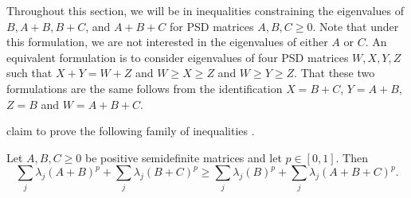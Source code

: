 \documentclass[notitlepage, 10pt]{article}
\begin{document}
Throughout this section, we will be in inequalities constraining the eigenvalues of $B,A+B,B+C$, and $A+B+C$ for PSD matrices $A,B,C \geq 0$.
Note that under this formulation, we are not interested in the eigenvalues of either $A$ or $C$.
An equivalent formulation is to consider eigenvalues of four PSD matrices $W,X,Y,Z$ such that $X+Y=W+Z$ and $W \geq X \geq Z$ and $W \geq Y \geq Z$.
That these two formulations are the same follows from the identification $X = B+C$, $Y = A+B$, $Z = B$ and $W = A+B+C$.


 claim to prove the following family of inequalities \cite[Lemma 5.3]{bouhtou2008optimization}.
\begin{lem}
    \label{lem:bouhtou_ineq}
    Let $A,B,C \geq 0$ be positive semidefinite matrices and let $p \in [0,1]$.
    Then
    \begin{equation}
        \sum_{j}\lambda_j(A+B)^p + \sum_{j}\lambda_j(B+C)^p \geq \sum_{j}\lambda_j(B)^p + \sum_{j}\lambda_j(A+B+C)^p.
    \end{equation}
\end{lem}
\end{document}
